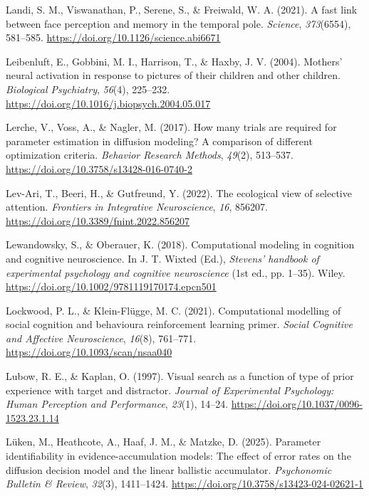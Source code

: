 \documentclass[
  letterpaper,
  DIV=11,
  numbers=noendperiod]{scrartcl}
\newlength{\cslhangindent}
\newenvironment{CSLReferences}[2] %
 {\begin{list}{}{%
  \setlength{\itemindent}{0pt}
  \setlength{\leftmargin}{0pt}
  \setlength{\parsep}{0pt}
  \ifodd #1
   \setlength{\leftmargin}{\cslhangindent}
   \setlength{\itemindent}{-1\cslhangindent}
  \fi
  \setlength{\itemsep}{#2\baselineskip}}}
 {\end{list}}
\begin{document}
\begin{CSLReferences}{1}{0}
Landi, S. M., Viswanathan, P., Serene, S., \& Freiwald, W. A. (2021). A
fast link between face perception and memory in the temporal pole.
\emph{Science}, \emph{373}(6554), 581--585.
\url{https://doi.org/10.1126/science.abi6671}

Leibenluft, E., Gobbini, M. I., Harrison, T., \& Haxby, J. V. (2004).
Mothers' neural activation in response to pictures of their children and
other children. \emph{Biological Psychiatry}, \emph{56}(4), 225--232.
\url{https://doi.org/10.1016/j.biopsych.2004.05.017}

Lerche, V., Voss, A., \& Nagler, M. (2017). How many trials are required
for parameter estimation in diffusion modeling? A comparison of
different optimization criteria. \emph{Behavior Research Methods},
\emph{49}(2), 513--537. \url{https://doi.org/10.3758/s13428-016-0740-2}

Lev-Ari, T., Beeri, H., \& Gutfreund, Y. (2022). The ecological view of
selective attention. \emph{Frontiers in Integrative Neuroscience},
\emph{16}, 856207. \url{https://doi.org/10.3389/fnint.2022.856207}

Lewandowsky, S., \& Oberauer, K. (2018). Computational modeling in
cognition and cognitive neuroscience. In J. T. Wixted (Ed.),
\emph{Stevens' handbook of experimental psychology and cognitive
neuroscience} (1st ed., pp. 1--35). Wiley.
\url{https://doi.org/10.1002/9781119170174.epcn501}

Lockwood, P. L., \& Klein-Flügge, M. C. (2021). Computational modelling
of social cognition and behaviour{\textemdash}a reinforcement learning
primer. \emph{Social Cognitive and Affective Neuroscience},
\emph{16}(8), 761--771. \url{https://doi.org/10.1093/scan/nsaa040}

Lubow, R. E., \& Kaplan, O. (1997). Visual search as a function of type
of prior experience with target and distractor. \emph{Journal of
Experimental Psychology: Human Perception and Performance},
\emph{23}(1), 14--24. \url{https://doi.org/10.1037/0096-1523.23.1.14}

Lüken, M., Heathcote, A., Haaf, J. M., \& Matzke, D. (2025). Parameter
identifiability in evidence-accumulation models: The effect of error
rates on the diffusion decision model and the linear ballistic
accumulator. \emph{Psychonomic Bulletin \& Review}, \emph{32}(3),
1411--1424. \url{https://doi.org/10.3758/s13423-024-02621-1}


\end{CSLReferences}
\end{document}
